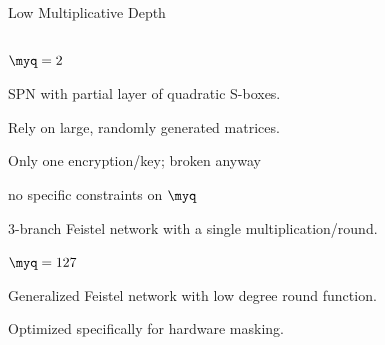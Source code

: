 \documentclass[presentation,aspectratio=1610]{beamer}
\begin{document}
\begin{frame}{Low Multiplicative Depth}
  
  \begin{columns}
    \begin{column}{0.6\textwidth}
      \begin{description}
        \setlength\itemsep{0.6cm}
      \item<1->[LowMC] \cite{EC:ARSTZ15} $\myq = 2$ 

        {\small SPN with partial layer of quadratic S-boxes.

          Rely on large, randomly generated  matrices.

        Only one encryption/key; broken anyway}
          
    \item<2->[Ciminion] \cite{EC:DGGK21} no specific constraints on $\myq$

      {\small 3-branch Feistel network with a single
        multiplication/round.}
          
    \item<3->[small-pSquare] \cite{EPRINT:GMMMS24} $\myq = 127$

      {\small Generalized Feistel network with low degree round function.

      Optimized specifically for hardware masking.}
      \end{description}
    \end{column}
    \hfill
    \begin{column}{0.35\textwidth}
    \end{column}
  \end{columns}
\end{frame}
\end{document}
